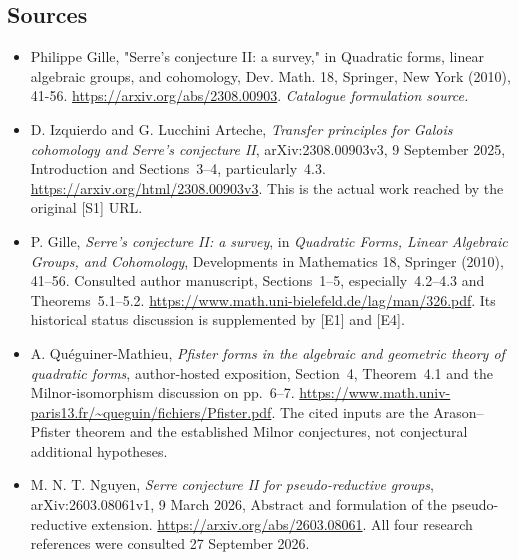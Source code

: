 \documentclass[11pt,a4paper]{article}
\numberwithin{equation}{section}
\begin{document}
\subsection{Sources}
\begin{itemize}\raggedright
\item[\textnormal{[S1]}]\hypertarget{source:30006799:1}{} Philippe Gille, "Serre's conjecture II: a survey," in Quadratic forms, linear algebraic groups, and cohomology, Dev. Math. 18, Springer, New York (2010), 41-56.
\url{https://arxiv.org/abs/2308.00903}.
{\small\textit{Catalogue formulation source.}}
\item[\textnormal{[E1]}]\hypertarget{extra:30006799:1}{}
D. Izquierdo and G. Lucchini Arteche, \emph{Transfer principles for Galois
cohomology and Serre's conjecture II}, arXiv:2308.00903v3,
9 September 2025, Introduction and Sections~3--4, particularly~4.3.
\url{https://arxiv.org/html/2308.00903v3}.
This is the actual work reached by the original [S1] URL.
\item[\textnormal{[E2]}]\hypertarget{extra:30006799:2}{}
P. Gille, \emph{Serre's conjecture II: a survey}, in \emph{Quadratic Forms,
Linear Algebraic Groups, and Cohomology}, Developments in Mathematics
18, Springer (2010), 41--56. Consulted author manuscript,
Sections~1--5, especially~4.2--4.3 and Theorems~5.1--5.2.
\url{https://www.math.uni-bielefeld.de/lag/man/326.pdf}.
Its historical status discussion is supplemented by [E1] and [E4].
\item[\textnormal{[E3]}]\hypertarget{extra:30006799:3}{}
A. Qu\'eguiner-Mathieu, \emph{Pfister forms in the algebraic and geometric
theory of quadratic forms}, author-hosted exposition, Section~4,
Theorem~4.1 and the Milnor-isomorphism discussion on pp.~6--7.
\url{https://www.math.univ-paris13.fr/~queguin/fichiers/Pfister.pdf}.
The cited inputs are the Arason--Pfister theorem and the established
Milnor conjectures, not conjectural additional hypotheses.
\item[\textnormal{[E4]}]\hypertarget{extra:30006799:4}{}
M. N. T. Nguyen, \emph{Serre conjecture II for pseudo-reductive groups},
arXiv:2603.08061v1, 9 March 2026, Abstract and formulation of the
pseudo-reductive extension. \url{https://arxiv.org/abs/2603.08061}.
All four research references were consulted 27 September 2026.
\end{itemize}
\end{document}
